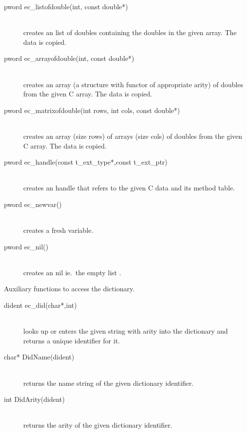 \begin{description}
\item[pword		ec_listofdouble(int, const double*)]\ \\
	creates an {\eclipse} list of doubles containing the doubles in the given array.
	The data is copied.

\item[pword		ec_arrayofdouble(int, const double*)]\ \\
	creates an {\eclipse} array (a structure with functor \nil of
	appropriate arity) of doubles from the given C array.
	The data is copied.

\item[pword		ec_matrixofdouble(int rows, int cols, const double*)]\ \\
	creates an {\eclipse} array (size rows) of arrays (size cols) of doubles
	from the given C array.  The data is copied.

\item[pword		ec_handle(const t_ext_type*,const t_ext_ptr)]\ \\
	creates an {\eclipse} handle that refers to the given C data and its
	method table.

\item[pword		ec_newvar()]\ \\
	creates a fresh {\eclipse} variable.

\item[pword		ec_nil()]\ \\
	creates an {\eclipse} nil ie.\ the empty list \nil.
\end{description}

Auxiliary functions to access the {\eclipse} dictionary.
\begin{description}
\item[dident		ec_did(char*,int)]\ \\
	looks up or enters the given string with arity into the {\eclipse}
	dictionary and returns a unique identifier for it.
\item[char*		DidName(dident)]\ \\
	returns the name string of the given dictionary identifier.
\item[int		DidArity(dident)]\ \\
	returns the arity of the given dictionary identifier.
\end{description}




